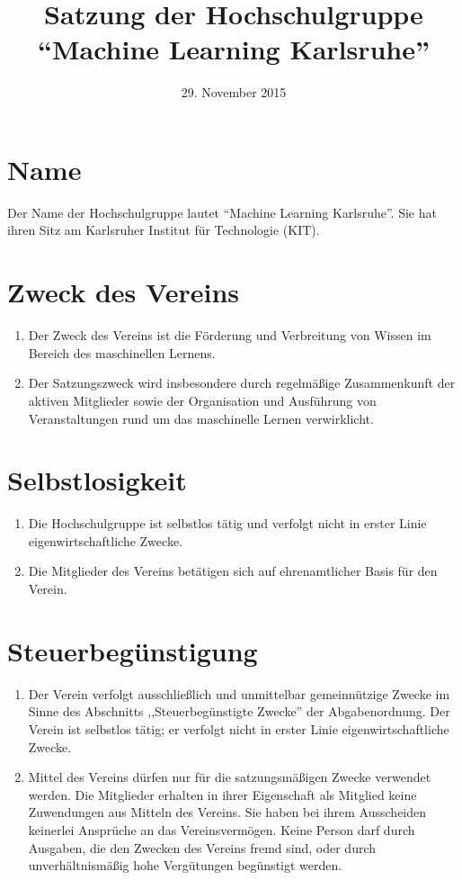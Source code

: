 \documentclass[a4paper]{scrartcl}
\newcommand\GruppenName{Machine Learning Karlsruhe}
\begin{document}
 \author{}
\title{Satzung der Hochschulgruppe \\ \enquote{\GruppenName{}}}
\date{29. November 2015}  %
\maketitle


\section{Name}
Der Name der Hochschulgruppe lautet \enquote{\GruppenName{}}. Sie hat ihren
Sitz am Karlsruher Institut für Technologie (KIT).

\section{Zweck des Vereins}
\begin{enumerate}
    \item Der Zweck des Vereins ist die Förderung und Verbreitung von Wissen
          im Bereich des maschinellen Lernens.
    \item Der Satzungszweck wird insbesondere durch regelmäßige
          Zusammenkunft der aktiven Mitglieder sowie der Organisation und
          Ausführung von Veranstaltungen rund um das maschinelle Lernen
          verwirklicht.
\end{enumerate}

\section{Selbstlosigkeit}
\begin{enumerate}
    \item Die Hochschulgruppe ist selbstlos tätig und verfolgt nicht in erster
          Linie eigenwirtschaftliche Zwecke.
    \item Die Mitglieder des Vereins betätigen sich auf ehrenamtlicher Basis
          für den Verein.
\end{enumerate}

\section{Steuerbegünstigung}
\begin{enumerate}
    \item Der Verein verfolgt ausschließlich und unmittelbar gemeinnützige
	  Zwecke im Sinne des Abschnitts ,,Steuerbegünstigte Zwecke''
	  der Abgabenordnung. Der Verein ist selbstlos tätig;
	  er verfolgt nicht in erster Linie eigenwirtschaftliche Zwecke.
    \item Mittel des Vereins dürfen nur für die satzungsmäßigen Zwecke
	  verwendet werden. Die Mitglieder erhalten in ihrer Eigenschaft
	  als Mitglied keine Zuwendungen aus Mitteln des Vereins.
	  Sie haben bei ihrem Ausscheiden keinerlei Ansprüche an das
	  Vereinsvermögen. Keine Person darf durch Ausgaben, die den
	  Zwecken des Vereins fremd sind, oder durch unverhältnismäßig
	  hohe Vergütungen begünstigt werden.
\end{enumerate}
\end{document}
